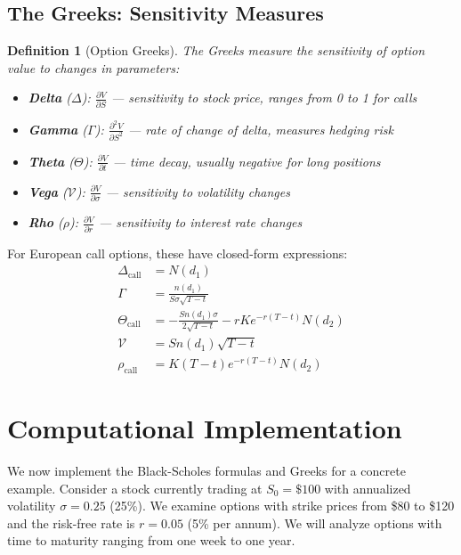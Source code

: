 \documentclass[a4paper, 11pt]{article}
\newtheorem{definition}{Definition}[section]
\begin{document}
\subsection{The Greeks: Sensitivity Measures}

\begin{definition}[Option Greeks]
The Greeks measure the sensitivity of option value to changes in parameters:
\begin{itemize}
\item \textbf{Delta} ($\Delta$): $\frac{\partial V}{\partial S}$ — sensitivity to stock price, ranges from 0 to 1 for calls
\item \textbf{Gamma} ($\Gamma$): $\frac{\partial^2 V}{\partial S^2}$ — rate of change of delta, measures hedging risk
\item \textbf{Theta} ($\Theta$): $\frac{\partial V}{\partial t}$ — time decay, usually negative for long positions
\item \textbf{Vega} ($\mathcal{V}$): $\frac{\partial V}{\partial \sigma}$ — sensitivity to volatility changes
\item \textbf{Rho} ($\rho$): $\frac{\partial V}{\partial r}$ — sensitivity to interest rate changes
\end{itemize}
\end{definition}

For European call options, these have closed-form expressions:
\begin{align}
\Delta_{\text{call}} &= N(d_1) \\
\Gamma &= \frac{n(d_1)}{S\sigma\sqrt{T-t}} \\
\Theta_{\text{call}} &= -\frac{S n(d_1) \sigma}{2\sqrt{T-t}} - rK e^{-r(T-t)} N(d_2) \\
\mathcal{V} &= S n(d_1) \sqrt{T-t} \\
\rho_{\text{call}} &= K(T-t)e^{-r(T-t)}N(d_2)
\end{align}

\section{Computational Implementation}

We now implement the Black-Scholes formulas and Greeks for a concrete example. Consider a stock currently trading at $S_0 = \$100$ with annualized volatility $\sigma = 0.25$ (25\%). We examine options with strike prices from \$80 to \$120 and the risk-free rate is $r = 0.05$ (5\% per annum). We will analyze options with time to maturity ranging from one week to one year.
\end{document}
